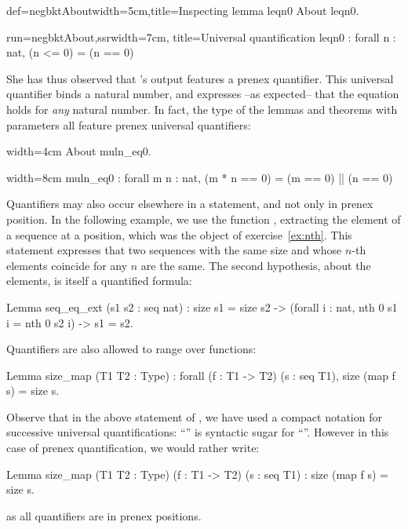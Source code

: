 \begin{coq}{def=negbktAbout}{width=5cm,title=Inspecting lemma leqn0}
About leqn0.
\end{coq}
\begin{coqout}{run=negbktAbout,ssr}{width=7cm, title=Universal quantification}
leqn0 : forall n : nat, (n <= 0) = (n == 0)
\end{coqout}

She has thus observed that \Coq{}'s output features a prenex
 quantifier. This universal quantifier binds a natural number, and
expresses --as expected-- that the equation holds for \emph{any}
natural number. In fact, the type of the lemmas and theorems with
parameters all feature prenex universal quantifiers:

\begin{coq}{}{width=4cm}
About muln_eq0.
$~$
\end{coq}
\begin{coqout}{}{width=8cm}
muln_eq0 : forall m n : nat,
  (m * n == 0) = (m == 0) || (n == 0)
\end{coqout}
Quantifiers may also occur elsewhere in a statement, and not only in
prenex position.  In the following example, we use the function
, extracting the element of a sequence at a position, which was
the object of exercise~\ref{ex:nth}. This statement expresses that two
sequences with the same size and whose $n$-th elements coincide for any
$n$ are the same. The second hypothesis, about the elements, is
itself a quantified formula:

\begin{coq}{}{}
Lemma seq_eq_ext (s1 s2 : seq nat) :
  size s1 = size s2 ->
  (forall i : nat, nth 0 s1 i = nth 0 s2 i) ->
  s1 = s2.
\end{coq}
Quantifiers are also allowed to range over functions:

\begin{coq}{}{}
Lemma size_map (T1 T2 : Type) :
  forall (f : T1 -> T2) (s : seq T1), size (map f s) = size s.
\end{coq}
Observe that in the above statement of , we have used a
compact notation for successive universal quantifications:
``'' is syntactic sugar for
``''. However in this case
of prenex quantification, we would rather write:

\begin{coq}{}{}
Lemma size_map (T1 T2 : Type) (f : T1 -> T2) (s : seq T1) :
  size (map f s) = size s.
\end{coq}
as all quantifiers are in prenex positions.

